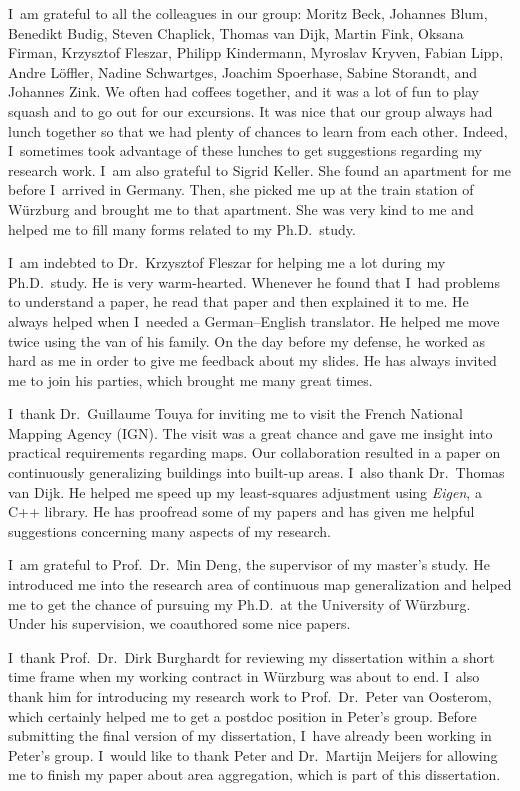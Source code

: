 I~am grateful to all the colleagues in our group:
Moritz Beck, Johannes Blum, Benedikt Budig, 
Steven Chaplick, Thomas van Dijk, 
Martin Fink, Oksana Firman, Krzysztof Fleszar, 
Philipp Kindermann, Myroslav Kryven, 
Fabian Lipp, Andre L\"offler, 
Nadine Schwartges, Joachim Spoerhase, Sabine Storandt, 
and Johannes Zink.
%
We often had coffees together,
and it was a lot of fun to play squash and to go out for our excursions.
It was nice that our group always had lunch together
so that we had plenty of chances to learn from each other.
Indeed, I~sometimes took advantage of these lunches
to get suggestions regarding my research work.
%
I~am also grateful to Sigrid Keller.
She found an apartment for me 
before I~arrived in Germany.
Then, she picked me up at the train station of W\"urzburg
and brought me to that apartment.
She was very kind to me 
and helped me to fill many forms related to my Ph.D.\ study.


I~am indebted to Dr.\ Krzysztof Fleszar for 
helping me a lot during my Ph.D.\ study.
He is very warm-hearted.
Whenever he found that I~had problems to understand a paper,
he read that paper and then explained it to me.
He always helped when I~needed a German--English translator.
He helped me move twice using the van of his family.
On the day before my defense, he worked as hard as me
in order to give me feedback about my slides.
He has always invited me to join his parties, 
which brought me many great times.

I~thank Dr.\ Guillaume Touya for inviting me to visit
the French National Mapping Agency (IGN).
The visit was a great chance and gave me insight into
practical requirements regarding maps.
Our collaboration resulted in a paper on continuously
generalizing buildings into built-up areas.
%
I~also thank Dr.\ Thomas van Dijk.
He helped me speed up my 
least-squares adjustment using \emph{Eigen}, a C++ library.
He has proofread some of my papers
and has given me helpful suggestions 
concerning many aspects of my research.

I~am grateful to Prof.\ Dr.\ Min Deng,
the supervisor of my master's study.
He introduced me into the research area of 
continuous map generalization 
and helped me to get the chance of
pursuing my Ph.D.\ at the University of W\"urzburg.
Under his supervision,
we coauthored some nice papers.


I~thank Prof.\ Dr.\ Dirk Burghardt 
for reviewing my dissertation within a short time frame
when my working contract in W\"urzburg was about to end.
I~also thank him for introducing my research work to
Prof.\ Dr.\ Peter van Oosterom, 
which certainly helped me to get a postdoc position
in Peter's group.
Before submitting the final version of my dissertation,
I~have already been working in Peter's group.
I~would like to thank Peter and Dr.\ Martijn Meijers 
for allowing me to finish my paper about area aggregation,
which is part of this dissertation.

